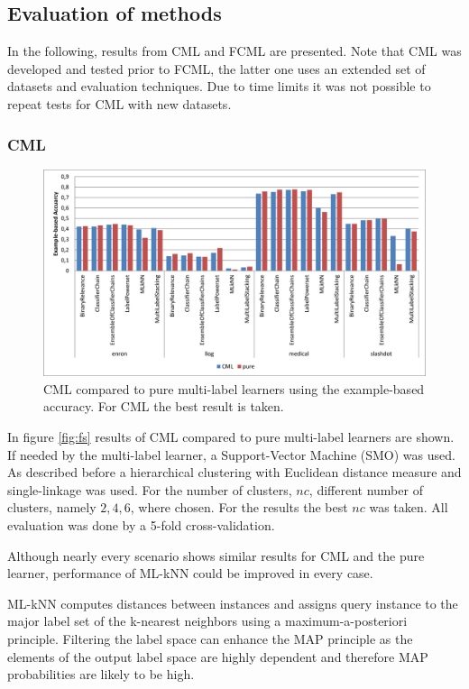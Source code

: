 	\subsection{Evaluation of methods}

		In the following, results from CML and FCML are presented. Note that CML was developed and tested prior to FCML, the latter one uses an extended set of datasets and evaluation techniques. Due to time limits it was not possible to repeat tests for CML with new datasets.

		\subsubsection{CML}

			\begin{figure}
				\includegraphics[width=\textwidth]{figures/cml_results.pdf}
				\caption{CML compared to pure multi-label learners using the example-based accuracy. For CML the best result is taken.}
				\label{fig:cml}
			\end{figure}

			In figure \ref{fig:fs} results of CML compared to pure multi-label learners are shown. If needed by the multi-label learner, a Support-Vector Machine (SMO) was used. As described before a hierarchical clustering with Euclidean distance measure and single-linkage was used. For the number of clusters, $nc$, different number of clusters, namely $2, 4, 6$, where chosen. For the results the best $nc$ was taken. All evaluation was done by a 5-fold cross-validation.

			Although nearly every scenario shows similar results for CML and the pure learner, performance of ML-kNN could be improved in every case.

			ML-kNN computes distances between instances and assigns query instance to the major label set of the k-nearest neighbors using a maximum-a-posteriori principle. Filtering the label space can enhance the MAP principle as the elements of the output label space are highly dependent and therefore MAP probabilities are likely to be high.

